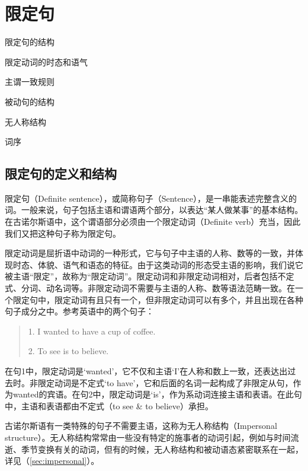\chapter{限定句}
\begin{introduction}[章节要点]
    \item 限定句的结构
    \item 限定动词的时态和语气
    \item 主谓一致规则
    \item 被动句的结构
    \item 无人称结构
    \item 词序
\end{introduction}

\section{限定句的定义和结构}
限定句（Definite sentence），或简称句子（Sentence），是一串能表述完整含义的词。一般来说，句子包括主语和谓语两个部分，以表达“某人做某事”的基本结构。在古诺尔斯语中，这个谓语部分必须由一个限定动词（Definite verb）充当，因此我们又把这种句子称为限定句。

限定动词是屈折语中动词的一种形式，它与句子中主语的人称、数等的一致，并体现时态、体貌、语气和语态的特征。由于这类动词的形态受主语的影响，我们说它被主语“限定”，故称为“限定动词”。限定动词和非限定动词相对，后者包括不定式、分词、动名词等。非限定动词不需要与主语的人称、数等语法范畴一致。在一个限定句中，限定动词有且只有一个，但非限定动词可以有多个，并且出现在各种句子成分之中。参考英语中的两个句子：
\begin{quote}
    1. I wanted to have a cup of coffee.
    
    2. To see is to believe.
\end{quote}

在句1中，限定动词是`wanted'，它不仅和主语`I'在人称和数上一致，还表达出过去时。非限定动词是不定式`to have'，它和后面的名词一起构成了非限定从句，作为wanted的宾语。在句2中，限定动词是`is'，作为系动词连接主语和表语。在此句中，主语和表语都由不定式（to see \& to believe）承担。


古诺尔斯语有一类特殊的句子不需要主语，这称为无人称结构（Impersonal structure）。无人称结构常常由一些没有特定的施事者的动词引起，例如与时间流逝、季节变换有关的动词，但有的时候，无人称结构和被动语态紧密联系在一起，详见（\ref{sec:impersonal}）。

